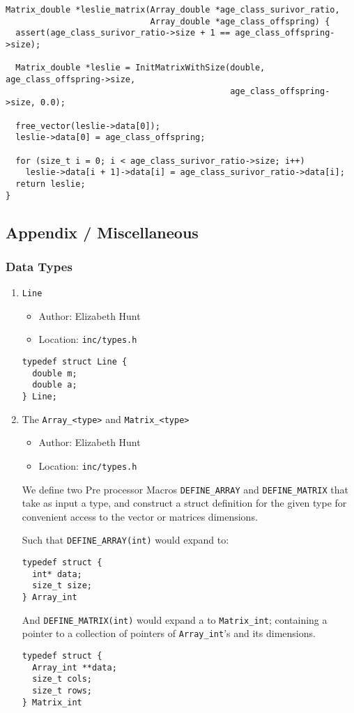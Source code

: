\documentclass[11pt]{article}
\begin{document}
\begin{verbatim}
Matrix_double *leslie_matrix(Array_double *age_class_surivor_ratio,
                             Array_double *age_class_offspring) {
  assert(age_class_surivor_ratio->size + 1 == age_class_offspring->size);

  Matrix_double *leslie = InitMatrixWithSize(double, age_class_offspring->size,
                                             age_class_offspring->size, 0.0);

  free_vector(leslie->data[0]);
  leslie->data[0] = age_class_offspring;

  for (size_t i = 0; i < age_class_surivor_ratio->size; i++)
    leslie->data[i + 1]->data[i] = age_class_surivor_ratio->data[i];
  return leslie;
}
\end{verbatim}
\subsection{Appendix / Miscellaneous}
\label{sec:org925aa32}
\subsubsection{Data Types}
\label{sec:org37335a1}
\begin{enumerate}
\item \texttt{Line}
\label{sec:orgaf72b30}
\begin{itemize}
\item Author: Elizabeth Hunt
\item Location: \texttt{inc/types.h}
\end{itemize}

\begin{verbatim}
typedef struct Line {
  double m;
  double a;
} Line;
\end{verbatim}
\item The \texttt{Array\_<type>} and \texttt{Matrix\_<type>}
\label{sec:org82faf8e}
\begin{itemize}
\item Author: Elizabeth Hunt
\item Location: \texttt{inc/types.h}
\end{itemize}

We define two Pre processor Macros \texttt{DEFINE\_ARRAY} and \texttt{DEFINE\_MATRIX} that take
as input a type, and construct a struct definition for the given type for
convenient access to the vector or matrices dimensions.

Such that \texttt{DEFINE\_ARRAY(int)} would expand to:

\begin{verbatim}
typedef struct {
  int* data;
  size_t size;
} Array_int
\end{verbatim}

And \texttt{DEFINE\_MATRIX(int)} would expand a to \texttt{Matrix\_int}; containing a pointer to
a collection of pointers of \texttt{Array\_int}'s and its dimensions.

\begin{verbatim}
typedef struct {
  Array_int **data;
  size_t cols;
  size_t rows;
} Matrix_int
\end{verbatim}
\end{enumerate}
\end{document}
